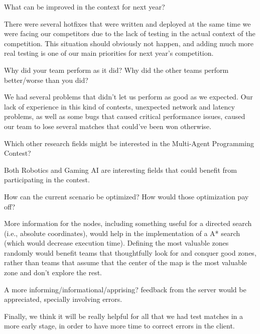 \begin{question}
What can be improved in the context for next year?
\end{question}

There were several hotfixes that were written and deployed at the same 
time we were facing our competitors due to the lack of testing in the 
actual context of the competition. This situation should obviously not 
happen, and adding much more real testing is one of our main priorities 
for next year's competition.

\begin{question}
Why did your team perform as it did? Why did the other teams perform
better/worse than you did?
\end{question}
We had several problems that didn't let us perform as good as we expected.
Our lack of experience in this kind of contests, unexpected network and latency
problems, as well as some bugs that caused critical performance issues, caused
our team to lose several matches that could've been won otherwise.

\begin{question}
Which other research fields might be interested in the Multi-Agent
Programming Contest?
\end{question}
Both Robotics and Gaming AI are interesting fields that could benefit from
participating in the contest.

\begin{question}
How can the current scenario be optimized? How would those optimization pay
off?
\end{question}

    More information for the nodes, including something useful for a directed
    search (i.e., absolute coordinates), would help in
    the implementation of a A* search (which would decrease execution time).
    Defining the most valuable zones randomly would benefit teams that
    thoughtfully look for and conquer good zones, rather than teams that assume
    that the center of the map is the most valuable zone and don't explore the
    rest.

    A more informing/informational/apprising? feedback from the server would
    be appreciated, specially involving errors.

    Finally, we think it will be really helpful for all that we had test
    matches in a more early stage, in order to have more time to correct
    errors in the client.
